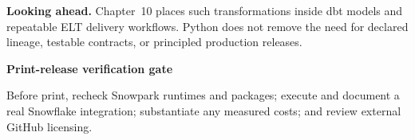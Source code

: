 \documentclass[11pt,twoside]{article}
\begin{document}
\textbf{Looking ahead.} Chapter~10 places such transformations inside dbt models and repeatable ELT delivery workflows. Python does not remove the need for declared lineage, testable contracts, or principled production releases.
\begin{insight}\textbf{Print-release verification gate}\par
Before print, recheck Snowpark runtimes and packages; execute and document a real Snowflake integration; substantiate any measured costs; and review external GitHub licensing.\end{insight}
\end{document}
